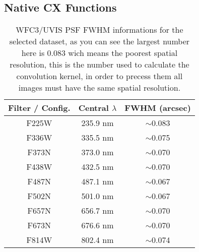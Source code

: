 \documentclass[11pt,fleqn,openany]{book} %
\begin{document}
\begin{appendices}
\chapter{Native CX Functions}

\begin{table}[h]
  \centering
    \begin{tabular}{ c c c }
    \hline\hline
    
    Filter / Config. & Central $\lambda$ & FWHM (arcsec)\\
    \hline
    
    F225W & 235.9 nm & $\sim$0.083\\
    
    F336W & 335.5 nm & $\sim$0.075\\
    
    F373N & 373.0 nm & $\sim$0.070\\
    
    F438W & 432.5 nm & $\sim$0.070\\
    
    F487N & 487.1 nm & $\sim$0.067\\
    
    F502N & 501.0 nm & $\sim$0.067\\
    
    F657N & 656.7 nm & $\sim$0.070\\
    
    F673N & 676.6 nm & $\sim$0.070\\
    
    F814W & 802.4 nm & $\sim$0.074\\
    
    \hline
  \end{tabular}
  \caption{WFC3/UVIS PSF FWHM informations for the selected dataset, as you can see the largest number here is 0.083 wich means the poorest spatial resolution, this is the number used to calculate the convolution kernel, in order to precess them all images must have the same spatial resolution.}
  \label{tab:dos}
\end{table}

\end{appendices}

\newpage

\printbibliography[heading=subbibliography,notkeyword=this]
\end{document}
